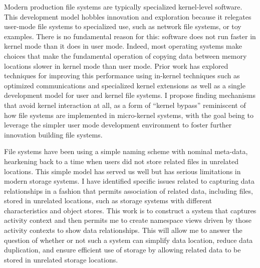 Modern production file systems are typically specialized kernel-level
software.
This development model hobbles innovation and exploration because it relegates
user-mode file systems to specialized use, such as network file systems, or toy
examples.  There is no fundamental reason for this: software does not run faster
in kernel mode than it does in user mode. Indeed, most operating systems make
choices that make the fundamental operation of copying data between memory
locations slower in kernel mode than user mode.  Prior work has explored
techniques for improving this performance using in-kernel techniques such as
optimized communications and specialized kernel extensions as well as a single
development model for user and kernel file systems.
I propose finding mechanisms that avoid kernel
interaction at all, as a form of “kernel bypass” reminiscent of how file systems
are implemented in micro-kernel systems, with the goal being to leverage the
simpler user mode development environment to foster further innovation building
file systems.

File systems have been using a simple naming scheme with nominal
meta-data,
hearkening back to a time when users did not store related files in unrelated
locations.  This simple model has served us well but has serious limitations in
modern storage systems.  I have identified specific issues
related to capturing data relationships in a fashion that permits association of related data,
including files, stored in unrelated locations, such as storage systems with
different characteristics and object stores.  This work is to construct a system
that captures activity context and then permits me to create namespace views
driven by those activity contexts to show data relationships.  This will allow
me to answer the question of whether or not such a system can simplify data
location, reduce data duplication, and ensure efficient use of storage by
allowing related data to be stored in unrelated storage locations.

